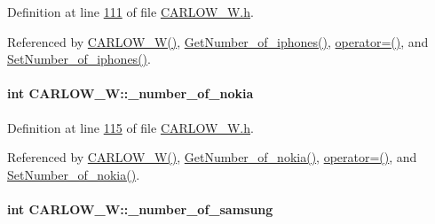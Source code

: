 Definition at line \hyperlink{_c_a_r_l_o_w___w_8h_source_l00111}{111} of file \hyperlink{_c_a_r_l_o_w___w_8h_source}{C\+A\+R\+L\+O\+W\+\_\+\+W.\+h}.



Referenced by \hyperlink{_c_a_r_l_o_w___w_8h_source_l00024}{C\+A\+R\+L\+O\+W\+\_\+\+W()}, \hyperlink{_c_a_r_l_o_w___w_8cpp_source_l00115}{Get\+Number\+\_\+of\+\_\+iphones()}, \hyperlink{_c_a_r_l_o_w___w_8h_source_l00075}{operator=()}, and \hyperlink{_c_a_r_l_o_w___w_8cpp_source_l00111}{Set\+Number\+\_\+of\+\_\+iphones()}.

\paragraph[{\texorpdfstring{\+\_\+number\+\_\+of\+\_\+nokia}{_number_of_nokia}}]{\setlength{\rightskip}{0pt plus 5cm}int C\+A\+R\+L\+O\+W\+\_\+\+W\+::\+\_\+number\+\_\+of\+\_\+nokia\hspace{0.3cm}{\ttfamily [private]}}\hypertarget{class_c_a_r_l_o_w___w_ac4c7e47711cc4c9e0bc01fc37cabe7d1_ac4c7e47711cc4c9e0bc01fc37cabe7d1}{}\label{class_c_a_r_l_o_w___w_ac4c7e47711cc4c9e0bc01fc37cabe7d1_ac4c7e47711cc4c9e0bc01fc37cabe7d1}


Definition at line \hyperlink{_c_a_r_l_o_w___w_8h_source_l00115}{115} of file \hyperlink{_c_a_r_l_o_w___w_8h_source}{C\+A\+R\+L\+O\+W\+\_\+\+W.\+h}.



Referenced by \hyperlink{_c_a_r_l_o_w___w_8h_source_l00024}{C\+A\+R\+L\+O\+W\+\_\+\+W()}, \hyperlink{_c_a_r_l_o_w___w_8cpp_source_l00083}{Get\+Number\+\_\+of\+\_\+nokia()}, \hyperlink{_c_a_r_l_o_w___w_8h_source_l00075}{operator=()}, and \hyperlink{_c_a_r_l_o_w___w_8cpp_source_l00079}{Set\+Number\+\_\+of\+\_\+nokia()}.

\paragraph[{\texorpdfstring{\+\_\+number\+\_\+of\+\_\+samsung}{_number_of_samsung}}]{\setlength{\rightskip}{0pt plus 5cm}int C\+A\+R\+L\+O\+W\+\_\+\+W\+::\+\_\+number\+\_\+of\+\_\+samsung\hspace{0.3cm}{\ttfamily [private]}}\hypertarget{class_c_a_r_l_o_w___w_ae47f54289c630e38341ce8b2c8decf0f_ae47f54289c630e38341ce8b2c8decf0f}{}\label{class_c_a_r_l_o_w___w_ae47f54289c630e38341ce8b2c8decf0f_ae47f54289c630e38341ce8b2c8decf0f}


